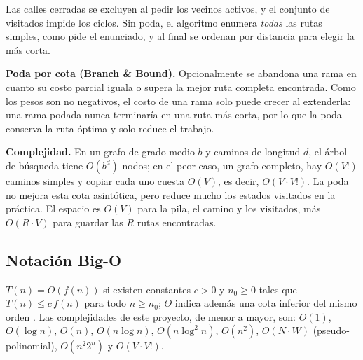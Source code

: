 \begin{algorithm}[H]
\SetAlgoLined
{}
\caption{Backtracking para todas las rutas simples}
\label{alg:backtracking}
\end{algorithm}

Las calles cerradas se excluyen al pedir los vecinos activos, y el conjunto de visitados impide los ciclos. Sin poda, el algoritmo enumera \emph{todas} las rutas simples, como pide el enunciado, y al final se ordenan por distancia para elegir la más corta.

\textbf{Poda por cota (Branch \& Bound).} Opcionalmente se abandona una rama en cuanto su costo parcial iguala o supera la mejor ruta completa encontrada. Como los pesos son no negativos, el costo de una rama solo puede crecer al extenderla: una rama podada nunca terminaría en una ruta más corta, por lo que la poda conserva la ruta óptima y solo reduce el trabajo.

\textbf{Complejidad.} En un grafo de grado medio $b$ y caminos de longitud $d$, el árbol de búsqueda tiene $O(b^d)$ nodos; en el peor caso, un grafo completo, hay $O(V!)$ caminos simples y copiar cada uno cuesta $O(V)$, es decir, $O(V\cdot V!)$. La poda no mejora esta cota asintótica, pero reduce mucho los estados visitados en la práctica. El espacio es $O(V)$ para la pila, el camino y los visitados, más $O(R\cdot V)$ para guardar las $R$ rutas encontradas.

\subsection{Notación Big-O}

$T(n)=O(f(n))$ si existen constantes $c>0$ y $n_0\ge0$ tales que $T(n)\le c\,f(n)$ para todo $n\ge n_0$; $\Theta$ indica además una cota inferior del mismo orden \citep{cormen2022introduction}. Las complejidades de este proyecto, de menor a mayor, son: $O(1)$, $O(\log n)$, $O(n)$, $O(n\log n)$, $O(n\log^2 n)$, $O(n^2)$, $O(N\cdot W)$ (pseudo-polinomial), $O(n^2 2^n)$ y $O(V\cdot V!)$.
